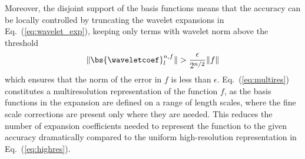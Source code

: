 Moreover, the disjoint support of the basis functions means that the accuracy can be 
locally controlled by truncating the wavelet expansions in Eq.~(\ref{eq:wavelet_exp}), 
keeping only terms with wavelet norm above the threshold
\begin{equation}
  \label{eq:threshold}
  \| \bs{\waveletcoef}_l^{n,f} \| > \frac{\epsilon}{2^{n/2}} \| f \|
\end{equation}
which ensures that the norm of the error in $f$ is less than $\epsilon$. 
Eq.~(\ref{eq:multires}) constitutes a multiresolution representation of the function 
$f$, as the basis functions in the expansion are defined on a range of length scales, 
where the fine scale corrections are present only where they are needed. This reduces
the number of expansion coefficients needed to represent the function to the given 
accuracy dramatically compared to the uniform high-resolution representation in
Eq.~(\ref{eq:highres}).

